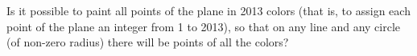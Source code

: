 \problem{}
Is it possible to paint all points of the plane in 2013 colors (that is, to assign each point of the plane an integer from 1 to 2013), so that on any line and any circle (of non-zero radius) there will be points of all the colors?

\solution
\endproblem
